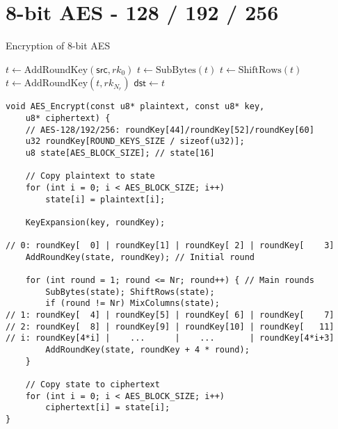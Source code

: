 \newpage
\section{8-bit AES - 128 / 192 / 256}

\begin{algorithm}[H]
	\caption{Encryption of 8-bit AES}
	
	\BlankLine
	$t \leftarrow \text{AddRoundKey}(\mathsf{src}, rk_0)$
	$t \leftarrow \text{SubBytes}(t)$\;
	$t \leftarrow \text{ShiftRows}(t)$\;
	$t \leftarrow \text{AddRoundKey}(t, rk_{N_r})$\;
	$\mathsf{dst} \leftarrow t$\;
	\;
\end{algorithm}

\begin{lstlisting}[style=C, caption={8-bit AES Encryption},captionpos=t]
void AES_Encrypt(const u8* plaintext, const u8* key,
	u8* ciphertext) {
	// AES-128/192/256: roundKey[44]/roundKey[52]/roundKey[60]
	u32 roundKey[ROUND_KEYS_SIZE / sizeof(u32)];
	u8 state[AES_BLOCK_SIZE]; // state[16]
	
	// Copy plaintext to state
	for (int i = 0; i < AES_BLOCK_SIZE; i++)
		state[i] = plaintext[i];
	
	KeyExpansion(key, roundKey);
	
// 0: roundKey[  0] | roundKey[1] | roundKey[ 2] | roundKey[    3]
	AddRoundKey(state, roundKey); // Initial round
	
	for (int round = 1; round <= Nr; round++) { // Main rounds
		SubBytes(state); ShiftRows(state);
		if (round != Nr) MixColumns(state);
// 1: roundKey[  4] | roundKey[5] | roundKey[ 6] | roundKey[    7]
// 2: roundKey[  8] | roundKey[9] | roundKey[10] | roundKey[   11]
// i: roundKey[4*i] |    ...      |    ...       | roundKey[4*i+3]
		AddRoundKey(state, roundKey + 4 * round);
	}
	
	// Copy state to ciphertext
	for (int i = 0; i < AES_BLOCK_SIZE; i++)
		ciphertext[i] = state[i];
}
\end{lstlisting}


